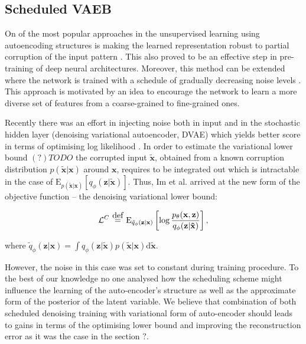 \documentclass[../report.tex]{subfiles}
\begin{document}
\subsection{Scheduled VAEB}
On of the most popular approaches in the unsupervised learning using autoencoding structures is making the learned representation robust to partial corruption of the input pattern \cite{vincentDAE}. This also proved to be an effective step in pre-training of deep neural architectures. Moreover, this method can be extended where the network is trained with a schedule of gradually decreasing noise levels \cite{sutton}.  This approach is motivated by an idea to encourage the network to learn a more diverse set of features from a coarse-grained to fine-grained ones.

Recently there was an effort in injecting noise both in input and in the stochastic hidden layer (denoising variational autoencoder, DVAE) which yields better score in terms of optimising log likelihood \cite{bengioDVAE}. In order to estimate the variational lower bound $(?)TODO$ the corrupted input $\mathbf{\widetilde{x}}$,  obtained from a known corruption distribution $p (\mathbf{\widetilde{x}} | \mathbf{x})$ around $\mathbf{x}$, requires to be integrated out which is intractable in the case of $\text{E}_{p (\mathbf{\widetilde{x}} | \mathbf{x})} \left[ q_{\phi}(\mathbf{z} | \mathbf{\widetilde{x}} )\right]$. Thus, Im et al. arrived at the new form of the objective function -- the denoising variational lower bound:

$$\mathcal{L}^{C} ~ \myeq ~ \text{E}_{\tilde{q}_\phi (\mathbf{z} | \mathbf{x})} \left[ 
\log \frac{p_{\theta} (\mathbf{x, z})}{q_\phi (\mathbf{z} | \mathbf{\tilde{x}})}
\right], $$

where $\tilde{q}_\phi (\mathbf{z} | \mathbf{x}) = \int q_\phi (\mathbf{z}| \mathbf{\tilde{x}}) p(\mathbf{\tilde{x}} | \mathbf{x}) \text{d}\mathbf{\tilde{x}}$. 

However, the noise in this case was set to constant during training procedure. To the best of our knowledge no one analysed how the scheduling scheme might influence the learning of the auto-encoder's structure as well as the approximate form of the posterior of the latent variable. We believe that combination of both scheduled denoising training with variational form of auto-encoder should leads to gains in terms of the optimising lower bound and improving the reconstruction error as it was the case in the section $?$.
\end{document}
